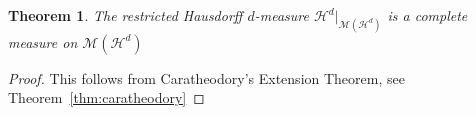 \documentclass{article}
\theoremstyle{plain}
\newtheorem{thm}{Theorem}[section]
\newtheorem{lem}[thm]{Lemma}
\theoremstyle{definition}
\DeclareMathOperator{\diam}{diam}
\theoremstyle{remark}
\begin{document}
\begin{thm}
    The restricted Hausdorff $d$-measure $\mathcal{H}^d |_{\mathcal{M}(\mathcal{H}^d)}$ is a complete measure on $\mathcal{M}(\mathcal{H}^d)$
\end{thm}

\begin{proof}
    This follows from Caratheodory's Extension Theorem, see Theorem~\ref{thm:caratheodory}
\end{proof}



\end{document}
